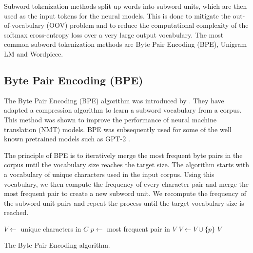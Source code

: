 Subword tokenization methods split up words into subword units, which are then used as the input tokens for the neural models. This is done to mitigate the out-of-vocabulary (OOV) problem and to reduce the computational complexity of the softmax cross-entropy loss over a very large output vocabulary. The most common subword tokenization methods are Byte Pair Encoding (BPE), Unigram LM and Wordpiece.


\subsection{Byte Pair Encoding (BPE)}

The Byte Pair Encoding (BPE) algorithm was introduced by \citet{Sennrich2015}. They have adapted a compression algorithm  to learn a subword vocabulary from a corpus. This method was shown to improve the performance of neural machine translation (NMT) models. BPE was subsequently used for some of the well known pretrained models such as GPT-2 \citep{Radford2019}.

The principle of BPE is to iteratively merge the most frequent byte pairs in the corpus until the vocabulary size reaches the target size. The algorithm starts with a vocabulary of unique characters used in the input corpus. Using this vocabulary, we then compute the frequency of every character pair and merge the most frequent pair to create a new subword unit. We recompute the frequency of the subword unit pairs and repeat the process until the target vocabulary size is reached.


\begin{algorithm}
    \begin{algorithmic}
        \State $V \gets$ unique characters in $C$
        \State $p \gets$ most frequent pair in $V$
        \State $V \gets V \cup \{p\}$
        \EndWhile
        \State \Return $V$
        \EndFunction
    \end{algorithmic}
    \caption{The Byte Pair Encoding algorithm.}
    \label{alg:bpe}
\end{algorithm}



